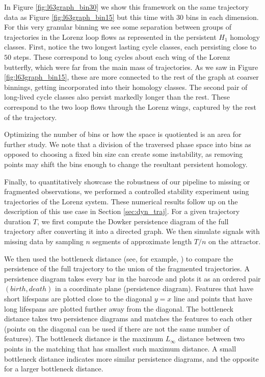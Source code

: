 \documentclass[pdflatex,bst/sn-mathphys-num]{sn-jnl}%
\theoremstyle{thmstyleone}%
\theoremstyle{definition}
\theoremstyle{thmstyletwo}%
\theoremstyle{thmstylethree}%
\begin{document}
In Figure \ref{fig:l63graph_bin30} we show this framework on the same trajectory data as Figure \ref{fig:l63graph_bin15} but this time with $30$ bins in each dimension. For this very granular binning we see some separation between groups of trajectories in the Lorenz loop flows as represented in the persistent $H_1$ homology classes. First, notice the two longest lasting cycle classes, each persisting close to $50$ steps. These correspond to long cycles about each wing of the Lorenz butterfly, which were far from the main mass of trajectories. As we saw in Figure \ref{fig:l63graph_bin15}, these are more connected to the rest of the graph at coarser binnings, getting incorporated into their homology classes. The second pair of long-lived cycle classes also persist markedly longer than the rest. These correspond to the two loop flows through the Lorenz wings, captured by the rest of the trajectory.



Optimizing the number of bins or how the space is quotiented is an area for further study. We note that a division of the traversed phase space into bins as opposed to choosing a fixed bin size can create some instability, as removing points may shift the bins enough to change the resultant persistent homology. 


Finally, to quantitatively showcase the robustness of our pipeline to missing or fragmented observations, we performed a controlled stability experiment using trajectories of the Lorenz system. These numerical results follow up on the description of this use case in Section \ref{sec:dyn_traj}.  For a given trajectory duration $T$, we first compute the Dowker persistence diagram of the full trajectory after converting it into a directed graph. We then simulate signals with missing data by sampling $n$ segments of approximate length $T/n$ on the attractor. 

We then used the bottleneck distance (see, for example, \cite{edelsbrunner2010computational}) to compare the persistence of the full trajectory to the union of the fragmented trajectories. A persistence diagram takes every bar in the barcode and plots it as an ordered pair $(birth, death)$ in a coordinate plane (persistence diagram). Features that have short lifespans are plotted close to the diagonal $y = x$ line and points that have long lifespans are plotted further away from the diagonal. The bottleneck distance takes two persistence diagrams and matches the features to each other (points on the diagonal can be used if there are not the same number of features). The bottleneck distance is the maximum $L_\infty$ distance between two points in the matching that has smallest such maximum distance. A small bottleneck distance indicates more similar persistence diagrams, and the opposite for a larger bottleneck distance. 
\end{document}
